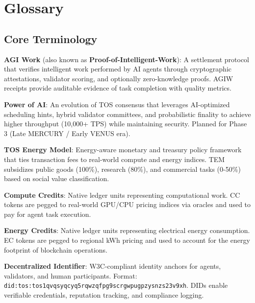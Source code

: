 \documentclass[11pt]{article}
\begin{document}
\clearpage

\section*{Glossary}

\subsection*{Core Terminology}

\begin{description}[leftmargin=3cm, style=nextline]
  \item[AGIW (PoIW)] \textbf{AGI Work} (also known as \textbf{Proof-of-Intelligent-Work}): A settlement protocol that verifies intelligent work performed by AI agents through cryptographic attestations, validator scoring, and optionally zero-knowledge proofs. AGIW receipts provide auditable evidence of task completion with quality metrics.

  \item[PAI] \textbf{Power of AI}: An evolution of TOS consensus that leverages AI-optimized scheduling hints, hybrid validator committees, and probabilistic finality to achieve higher throughput (10,000+ TPS) while maintaining security. Planned for Phase 3 (Late MERCURY / Early VENUS era).

  \item[TEM] \textbf{TOS Energy Model}: Energy-aware monetary and treasury policy framework that ties transaction fees to real-world compute and energy indices. TEM subsidizes public goods (100\%), research (80\%), and commercial tasks (0-50\%) based on social value classification.

  \item[CC] \textbf{Compute Credits}: Native ledger units representing computational work. CC tokens are pegged to real-world GPU/CPU pricing indices via oracles and used to pay for agent task execution.

  \item[EC] \textbf{Energy Credits}: Native ledger units representing electrical energy consumption. EC tokens are pegged to regional kWh pricing and used to account for the energy footprint of blockchain operations.

  \item[DID] \textbf{Decentralized Identifier}: W3C-compliant identity anchors for agents, validators, and human participants. Format: \texttt{did:tos:tos1qvqsyqcyq5rqwzqfpg9scrgwpugpzysnzs23v9xh}. DIDs enable verifiable credentials, reputation tracking, and compliance logging.


\end{description}
\end{document}
